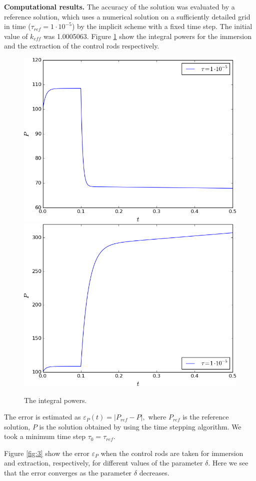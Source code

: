\documentclass[runningheads]{llncs}
\begin{document}
\textbf{Computational results.}
The accuracy of the solution was evaluated by a reference solution, which uses a numerical solution on a sufficiently detailed grid in time
($\tau_{ref} = 1 \cdot 10^{-5}$) by the implicit scheme with a fixed time step. The initial value of $k_{eff}$ was 1.0005063. Figure \ref{fig:2} show the integral powers for the immersion and the extraction of the control rods respectively.

\begin{figure}[ht]
  \begin{center}
    \includegraphics[width=0.48\linewidth] {power_down.png}
    \includegraphics[width=0.48\linewidth] {power_up.png}
	\caption{The integral powers.}
	\label{fig:2}
  \end{center}
\end{figure}

The error is estimated as $\varepsilon_P(t) = |P_{ref} - P|,$
where $P_{ref}$ is the reference solution, $P$ is the solution obtained by using the time stepping algorithm.
We took a minimum time step $\tau_0 = \tau_{ref}$.

Figure \ref{fig:3} show the error $\varepsilon_P$ when the control rods are taken for immersion and extraction, respectively, for different values of the parameter
$\delta$. Here we see that the error converges as the parameter $\delta$ decreases.
\end{document}
